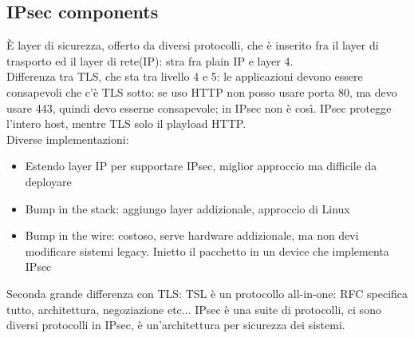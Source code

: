 \documentclass[16px]{article}
\begin{document}
\subsection{IPsec components}
È layer di sicurezza, offerto da diversi protocolli, che è inserito fra il layer di trasporto ed il layer di rete(IP): stra fra plain IP e layer 4.\\ Differenza tra TLS, che sta tra livello 4 e 5: le applicazioni devono essere consapevoli che c'è TLS sotto: se uso HTTP non posso usare porta 80, ma devo usare 443, quindi devo esserne consapevole; in IPsec non è così. IPsec protegge l'intero host, mentre TLS solo il playload HTTP.\\ Diverse implementazioni:
\begin{itemize}
\item Estendo layer IP per supportare IPsec, miglior approccio ma difficile da deployare
\item Bump in the stack: aggiungo layer addizionale, approccio di Linux
\item Bump in the wire: costoso, serve hardware addizionale, ma non devi modificare sistemi legacy. Inietto il pacchetto in un device che implementa IPsec
\end{itemize}
Seconda grande differenza con TLS: TSL è un protocollo all-in-one: RFC specifica tutto, architettura, negoziazione etc... IPsec è una suite di protocolli, ci sono diversi protocolli in IPsec, è un'architettura per sicurezza dei sistemi.
\end{document}
